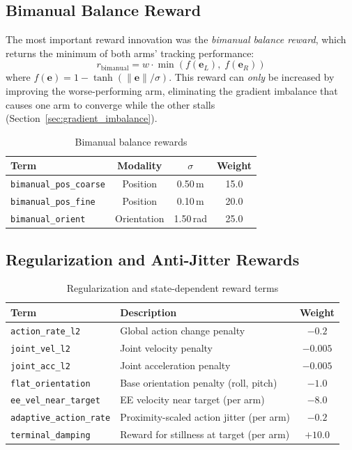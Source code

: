 \documentclass[11pt,a4paper]{article}
\begin{document}
\subsection{Bimanual Balance Reward}
\label{sec:bimanual_balance}
The most important reward innovation was the \emph{bimanual balance reward}, which returns the minimum of both arms' tracking performance:
\begin{equation}
  r_{\text{bimanual}} = w \cdot \min\!\left(f(\mathbf{e}_L),\; f(\mathbf{e}_R)\right)
\end{equation}
where $f(\mathbf{e}) = 1 - \tanh(\|\mathbf{e}\|/\sigma)$. This reward can \emph{only} be increased by improving the worse-performing arm, eliminating the gradient imbalance that causes one arm to converge while the other stalls (Section~\ref{sec:gradient_imbalance}).

\begin{table}[H]
\centering
\caption{Bimanual balance rewards}
\label{tab:bimanual}
\begin{tabular}{@{}lccc@{}}
\toprule
\textbf{Term} & \textbf{Modality} & \textbf{$\sigma$} & \textbf{Weight} \\
\midrule
\texttt{bimanual\_pos\_coarse} & Position & 0.50\,m & 15.0 \\
\texttt{bimanual\_pos\_fine}   & Position & 0.10\,m & 20.0 \\
\texttt{bimanual\_orient}      & Orientation & 1.50\,rad & 25.0 \\
\bottomrule
\end{tabular}
\end{table}

\subsection{Regularization and Anti-Jitter Rewards}

\begin{table}[H]
\centering
\caption{Regularization and state-dependent reward terms}
\label{tab:regularization}
\begin{tabular}{@{}llc@{}}
\toprule
\textbf{Term} & \textbf{Description} & \textbf{Weight} \\
\midrule
\texttt{action\_rate\_l2} & Global action change penalty & $-0.2$ \\
\texttt{joint\_vel\_l2} & Joint velocity penalty & $-0.005$ \\
\texttt{joint\_acc\_l2} & Joint acceleration penalty & $-0.005$ \\
\texttt{flat\_orientation} & Base orientation penalty (roll, pitch) & $-1.0$ \\
\texttt{ee\_vel\_near\_target} & EE velocity near target (per arm) & $-8.0$ \\
\texttt{adaptive\_action\_rate} & Proximity-scaled action jitter (per arm) & $-0.2$ \\
\texttt{terminal\_damping} & Reward for stillness at target (per arm) & $+10.0$ \\
\bottomrule
\end{tabular}
\end{table}
\end{document}
